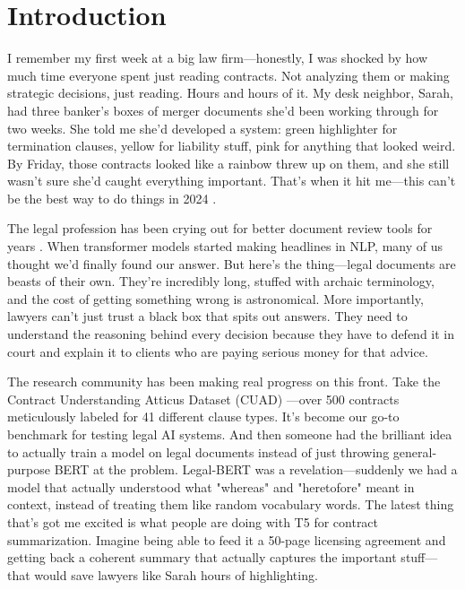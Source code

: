 \section{Introduction}

I remember my first week at a big law firm—honestly, I was shocked by how much time everyone spent just reading contracts. Not analyzing them or making strategic decisions, just reading. Hours and hours of it. My desk neighbor, Sarah, had three banker's boxes of merger documents she'd been working through for two weeks. She told me she'd developed a system: green highlighter for termination clauses, yellow for liability stuff, pink for anything that looked weird. By Friday, those contracts looked like a rainbow threw up on them, and she still wasn't sure she'd caught everything important. That's when it hit me—this can't be the best way to do things in 2024 \cite{katz2017general}.

The legal profession has been crying out for better document review tools for years \cite{zhong2018legal, sulea2017exploring}. When transformer models started making headlines in NLP, many of us thought we'd finally found our answer. But here's the thing—legal documents are beasts of their own. They're incredibly long, stuffed with archaic terminology, and the cost of getting something wrong is astronomical. More importantly, lawyers can't just trust a black box that spits out answers. They need to understand the reasoning behind every decision because they have to defend it in court and explain it to clients who are paying serious money for that advice.

The research community has been making real progress on this front. Take the Contract Understanding Atticus Dataset (CUAD) \cite{hendrycks2021cuad}—over 500 contracts meticulously labeled for 41 different clause types. It's become our go-to benchmark for testing legal AI systems. And then someone had the brilliant idea to actually train a model on legal documents instead of just throwing general-purpose BERT at the problem. Legal-BERT \cite{chalkidis2020legal} was a revelation—suddenly we had a model that actually understood what "whereas" and "heretofore" meant in context, instead of treating them like random vocabulary words. The latest thing that's got me excited is what people are doing with T5 \cite{raffel2020t5} for contract summarization. Imagine being able to feed it a 50-page licensing agreement and getting back a coherent summary that actually captures the important stuff—that would save lawyers like Sarah hours of highlighting.


